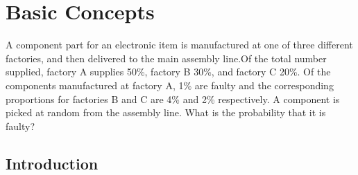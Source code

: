 
\chapter{Basic Concepts}

A component part for an electronic item is
manufactured at one of three different factories, and then delivered to
the main assembly line.Of the total number supplied, factory A supplies
50\%, factory B 30\%, and factory C 20\%. Of the components
manufactured at factory A, 1\% are faulty and the corresponding
proportions for factories B and C are 4\% and 2\% respectively. A
component is picked at random from the assembly line. What is the
probability that it is faulty? 

\section{Introduction}\label{intro}%
